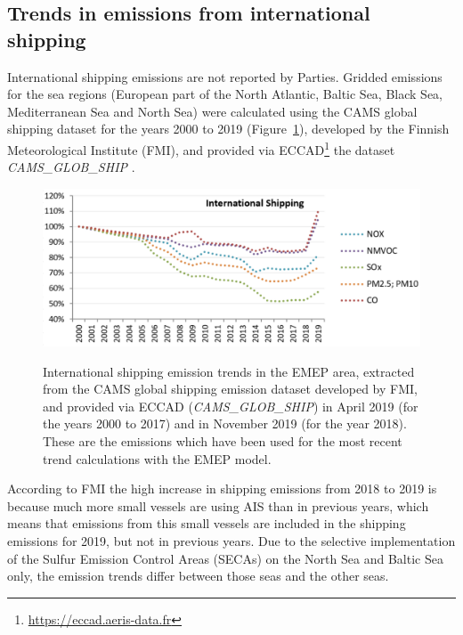 
\subsection{Trends in emissions from international shipping}
\label{sec:shiptrends}

International shipping emissions are not reported by Parties. Gridded emissions for the sea regions (European part of the North Atlantic, Baltic Sea, Black Sea, Mediterranean Sea and North Sea) were calculated using the CAMS global shipping dataset \citep{CAMSemis2019} for the years 2000 to 2019 (Figure~\ref{fig:CEIP10}), developed by the Finnish Meteorological Institute (FMI), and provided via ECCAD\footnote{\url{https://eccad.aeris-data.fr}} the dataset {\it CAMS\_GLOB\_SHIP} \citep{ECCAD}.

\begin{figure}[h]
\centering
{\includegraphics*[viewport=1 1 553 230,clip,width=0.75\linewidth]{FIGS_CEIP/Fig10.pdf}}
\caption{International shipping emission trends in the EMEP area, extracted from the CAMS global shipping emission dataset developed by FMI, and provided via ECCAD ({\it CAMS\_GLOB\_SHIP}) in April 2019 (for the years 2000 to 2017) and in November 2019 (for the year 2018). These are the emissions which have been used for the most recent trend calculations with the EMEP model.
}
\label{fig:CEIP10}
\end{figure}


According to FMI the high increase in shipping emissions from 2018 to 2019 is because much more small vessels are using AIS than in previous years, which means that emissions from this small vessels are included in the shipping emissions for 2019, but not in previous years.
Due to the selective implementation of the Sulfur Emission Control Areas (SECAs) on the North Sea and Baltic Sea only, the emission trends differ between those seas and the other seas.




